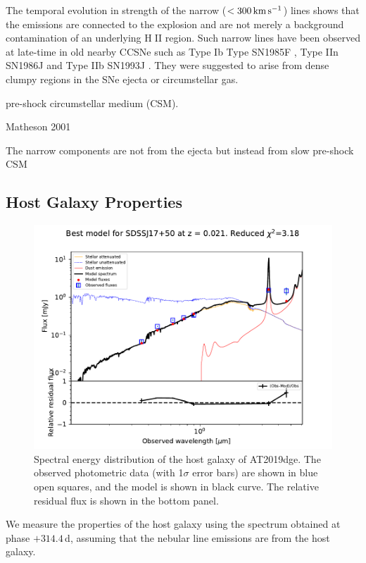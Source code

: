 \documentclass[twocolumn]{aastex63}
\def\ion#1#2{#1$\;${\footnotesize\rm{#2}}\relax}
\begin{document}
\begin{CJK*}{UTF8}{gbsn}
The temporal evolution in strength of the narrow ($< 300\,{\rm km\,s^{-1}}$) lines shows that the 
emissions are connected to the explosion and are not merely a background contamination of an 
underlying \ion{H}{II} region. Such narrow lines have been observed at late-time in old nearby CCSNe 
such as Type Ib Type SN1985F \citep{Filippenko1989}, Type IIn SN1986J \citep{Leibundgut1991} and 
Type IIb SN1993J \citep{Matheson2000}. They were suggested to arise from dense clumpy regions in 
the SNe ejecta or circumstellar gas.

pre-shock circumstellar medium
(CSM).

Matheson 2001 \citep{Matheson2001}

The narrow components are not from the ejecta but instead from slow pre-shock CSM

\subsection{Host Galaxy Properties}
\begin{figure}[htbp!]
	\centering
	\includegraphics[width=\columnwidth]{figures/SDSSJ17+50_best_model.pdf}
	\caption{Spectral energy distribution of the host galaxy of AT2019dge. The observed photometric 
		data (with 1$\sigma$ error bars) are shown in blue open squares, and the model is shown in black 
		curve. The relative residual flux is shown in the bottom panel.
		\label{fig:SEDfit}}
\end{figure}

We measure the properties of the host galaxy using the spectrum obtained at phase $+314.4$\,d, 
assuming that the nebular line emissions are from the host galaxy. 


\end{CJK*}
\end{document}

